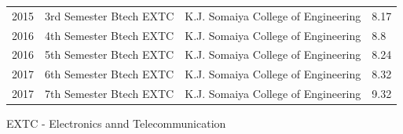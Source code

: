 \documentclass[letterpaper,11pt]{article}
\begin{document}
\begin{table}[h!]
\begin{center}
\begin{tabular}{l|c|r|l}
		2015 & \hspace{0.2cm} 3rd Semester Btech EXTC \hspace{0.2cm} & \hspace{0.2cm}K.J. Somaiya College of Engineering\hspace{0.2cm} & \hspace{1.2cm} 8.17 \hspace{0.2cm}\\
		2016 & \hspace{0.2cm} 4th Semester Btech EXTC \hspace{0.2cm} & \hspace{0.2cm}K.J. Somaiya College of Engineering\hspace{0.2cm} & \hspace{1.2cm} 8.8 \hspace{0.2cm}\\
		2016 & \hspace{0.2cm} 5th Semester Btech EXTC \hspace{0.2cm} & \hspace{0.2cm}K.J. Somaiya College of Engineering\hspace{0.2cm} & \hspace{1.2cm} 8.24 \hspace{0.2cm}\\
		2017 & \hspace{0.2cm} 6th Semester Btech EXTC \hspace{0.2cm} & \hspace{0.2cm}K.J. Somaiya College of Engineering\hspace{0.2cm} & \hspace{1.2cm} 8.32 \hspace{0.2cm}\\
		2017 & \hspace{0.2cm} 7th Semester Btech EXTC \hspace{0.2cm} & \hspace{0.2cm}K.J. Somaiya College of Engineering\hspace{0.2cm} & \hspace{1.2cm} 9.32 \hspace{0.2cm}\\
		      
          \end{tabular}
  \end{center}
\end{table}

EXTC - Electronics annd Telecommunication \\
\end{document}
